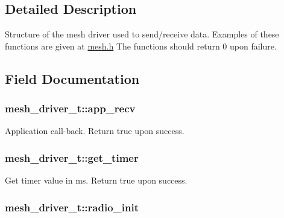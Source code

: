 \subsection{Detailed Description}
Structure of the mesh driver used to send/receive data. Examples of these functions are given at \hyperlink{mesh_8h}{mesh.\+h} The functions should return 0 upon failure. 

\subsection{Field Documentation}
\subsubsection[{\texorpdfstring{app\+\_\+recv}{app_recv}}]{ mesh\+\_\+driver\+\_\+t\+::app\+\_\+recv}\hypertarget{structmesh__driver__t_a8b1713e38a869bcd8c0e9f4fc139e5bd}{}\label{structmesh__driver__t_a8b1713e38a869bcd8c0e9f4fc139e5bd}


Application call-\/back. Return true upon success. 

\subsubsection[{\texorpdfstring{get\+\_\+timer}{get_timer}}]{ mesh\+\_\+driver\+\_\+t\+::get\+\_\+timer}\hypertarget{structmesh__driver__t_a2bd99112f2188d5129974939d6a1bae0}{}\label{structmesh__driver__t_a2bd99112f2188d5129974939d6a1bae0}


Get timer value in ms. Return true upon success. 

\subsubsection[{\texorpdfstring{radio\+\_\+init}{radio_init}}]{ mesh\+\_\+driver\+\_\+t\+::radio\+\_\+init}\hypertarget{structmesh__driver__t_a33b6b9bf00488248cd33d17129f74bc4}{}\label{structmesh__driver__t_a33b6b9bf00488248cd33d17129f74bc4}


